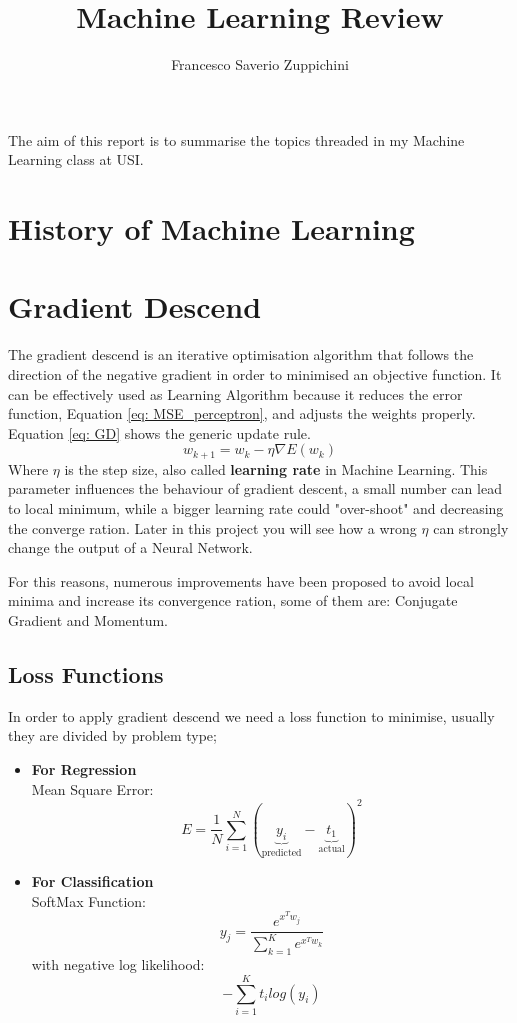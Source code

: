 \documentclass[11pt]{article}
\title{Machine Learning Review}
\author{Francesco Saverio Zuppichini}
\begin{document}
\maketitle
The aim of this report is to summarise the topics threaded in my Machine Learning class at USI.
\section{History of Machine Learning}

\section{Gradient Descend}
The gradient descend is an iterative optimisation algorithm that follows the direction of the negative gradient in order to minimised an objective function. It can be effectively used as Learning Algorithm because it reduces the error function, Equation \ref{eq: MSE_perceptron}, and adjusts the weights properly. Equation \ref{eq: GD} shows the generic update rule.
\begin{equation}
	w_{k + 1} = w_k - \eta \nabla E(w_k)
	\label{eq: gradient_descent}
\end{equation}
Where $\eta$ is the step size, also called \textbf{learning rate} in Machine Learning. This parameter influences the behaviour of gradient descent, a small number can lead to local minimum, while a bigger learning rate could "over-shoot" and decreasing the converge ration. Later in this project you will see how a wrong $\eta$ can strongly change the output of a Neural Network.

For this reasons, numerous improvements have been proposed to avoid local minima and increase its convergence ration, some of them are: Conjugate Gradient and Momentum.
\subsection{Loss Functions}
In order to apply gradient descend we need a loss function to minimise, usually they are divided by problem type;

\begin{itemize}
	\item \textbf{For Regression} \\
	Mean Square Error: \\
	\begin{equation}
	E = \frac{1}{N}\sum_{i=1}^N(\underbrace{y_i}_{\text{predicted}} - \underbrace{t_1}_{\text{actual}})^2
	\label{eq: MSE}	
	\end{equation}
	\item \textbf{For Classification} \\
	SoftMax Function:
	\begin{equation}
	y_j = \frac{e^{x^Tw_j}}{\sum_{k = 1}^K e^{x^Tw_k}}
	\label{eq: soft_max}	
	\end{equation}
	with negative log likelihood:\\
	\begin{equation}
	- \sum_{i = 1}^K t_ilog(y_i)
	\label{eq: log_like}
	\end{equation}
	
\end{itemize}
\end{document}
